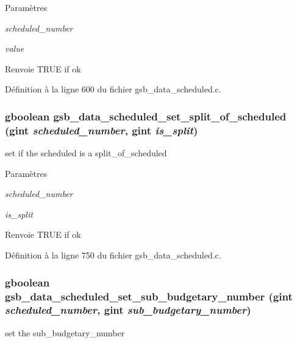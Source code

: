\begin{DoxyParams}{Paramètres}
\item[{\em scheduled\_\-number}]\item[{\em value}]\end{DoxyParams}
\begin{DoxyReturn}{Renvoie}
TRUE if ok 
\end{DoxyReturn}


Définition à la ligne 600 du fichier gsb\_\-data\_\-scheduled.c.

\subsubsection[{gsb\_\-data\_\-scheduled\_\-set\_\-split\_\-of\_\-scheduled}]{\setlength{\rightskip}{0pt plus 5cm}gboolean gsb\_\-data\_\-scheduled\_\-set\_\-split\_\-of\_\-scheduled (gint {\em scheduled\_\-number}, \/  gint {\em is\_\-split})}\label{gsb__data__scheduled_8c_a99239d1e344d4e3d86a28c95632ab234}
set if the scheduled is a split\_\-of\_\-scheduled 
\begin{DoxyParams}{Paramètres}
\item[{\em scheduled\_\-number}]\item[{\em is\_\-split}]\end{DoxyParams}
\begin{DoxyReturn}{Renvoie}
TRUE if ok 
\end{DoxyReturn}


Définition à la ligne 750 du fichier gsb\_\-data\_\-scheduled.c.

\subsubsection[{gsb\_\-data\_\-scheduled\_\-set\_\-sub\_\-budgetary\_\-number}]{\setlength{\rightskip}{0pt plus 5cm}gboolean gsb\_\-data\_\-scheduled\_\-set\_\-sub\_\-budgetary\_\-number (gint {\em scheduled\_\-number}, \/  gint {\em sub\_\-budgetary\_\-number})}\label{gsb__data__scheduled_8c_a8bf824ef47fb1e26554ac1c4b7df2438}
set the sub\_\-budgetary\_\-number


